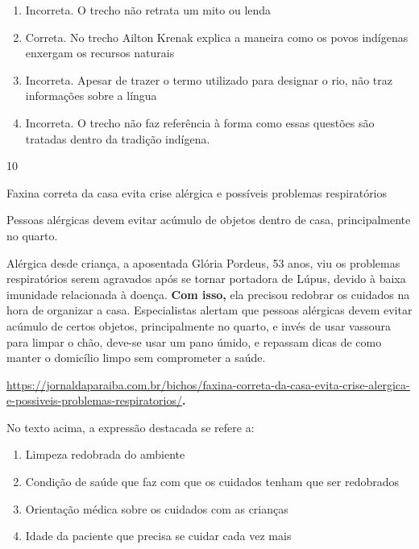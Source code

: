 {{\begin{itemize}
\begin{itemize}
\begin{enumerate}
\def\labelenumi{\arabic{enumi}.}
\item
  Incorreta. O trecho não retrata um mito ou lenda
\item
  Correta. No trecho Ailton Krenak explica a maneira como os povos
  indígenas enxergam os recursos naturais
\item
  Incorreta. Apesar de trazer o termo utilizado para designar o rio, não
  traz informações sobre a língua
\item
  Incorreta. O trecho não faz referência à forma como essas questões são
  tratadas dentro da tradição indígena.
\end{enumerate}

\num{10}

Faxina correta da casa evita crise alérgica e possíveis problemas
respiratórios

Pessoas alérgicas devem evitar acúmulo de objetos dentro de casa,
principalmente no quarto.

Alérgica desde criança, a aposentada Glória Pordeus, 53 anos, viu os
problemas respiratórios serem agravados após se tornar portadora de
Lúpus, devido à baixa imunidade relacionada à doença. \textbf{Com isso,}
ela precisou redobrar os cuidados na hora de organizar a casa.
Especialistas alertam que pessoas alérgicas devem evitar acúmulo de
certos objetos, principalmente no quarto, e invés de usar vassoura para
limpar o chão, deve-se usar um pano úmido, e repassam dicas de como
manter o domicílio limpo sem comprometer a saúde.

\href{https://jornaldaparaiba.com.br/bichos/faxina-correta-da-casa-evita-crise-alergica-e-possiveis-problemas-respiratorios/}{\uline{https://jornaldaparaiba.com.br/bichos/faxina-correta-da-casa-evita-crise-alergica-e-possiveis-problemas-respiratorios/}}\textbf{.}

No texto acima, a expressão destacada se refere a:

\begin{enumerate}
\def\labelenumi{\alph{enumi})}
\item
  Limpeza redobrada do ambiente
\item
  Condição de saúde que faz com que os cuidados tenham que ser
  redobrados
\item
  Orientação médica sobre os cuidados com as crianças
\item
  Idade da paciente que precisa se cuidar cada vez mais
\end{enumerate}


\end{itemize}
\end{itemize}}}
